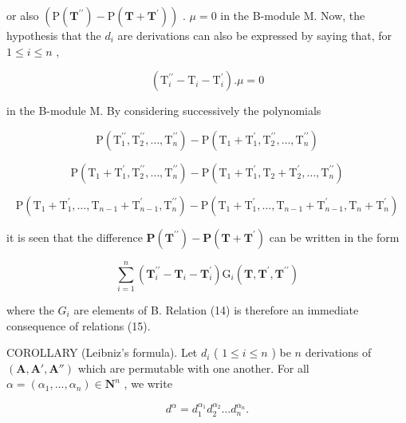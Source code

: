 or also \((\mathrm{P}(\mathbf{T}^{\prime\prime}) - \mathrm{P}(\mathbf{T} + \mathbf{T}^{\prime}))\) . \(\mu = 0\) in the B-module M. Now, the hypothesis that the \(d_{i}\) are derivations can also be expressed by saying that, for \(1 \leqslant i \leqslant n\) ,

\[
\left(\mathrm{T} _ {i} ^ {\prime \prime} - \mathrm{T} _ {i} - \mathrm{T} _ {i} ^ {\prime}\right). \mu = 0\tag{15}
\]

in the B-module M. By considering successively the polynomials

\[
\mathrm{P} \left(\mathrm{T} _ {1} ^ {\prime \prime}, \mathrm{T} _ {2} ^ {\prime \prime}, \dots , \mathrm{T} _ {n} ^ {\prime \prime}\right) - \mathrm{P} \left(\mathrm{T} _ {1} + \mathrm{T} _ {1} ^ {\prime}, \mathrm{T} _ {2} ^ {\prime \prime}, \dots , \mathrm{T} _ {n} ^ {\prime \prime}\right)
\]

\[
\mathrm{P} \left(\mathrm{T} _ {1} + \mathrm{T} _ {1} ^ {\prime}, \mathrm{T} _ {2} ^ {\prime \prime}, \dots , \mathrm{T} _ {n} ^ {\prime \prime}\right) - \mathrm{P} \left(\mathrm{T} _ {1} + \mathrm{T} _ {1} ^ {\prime}, \mathrm{T} _ {2} + \mathrm{T} _ {2} ^ {\prime}, \dots , \mathrm{T} _ {n} ^ {\prime \prime}\right)
\]

\[
\mathrm{P} \left(\mathrm{T} _ {1} + \mathrm{T} _ {1} ^ {\prime}, \dots , \mathrm{T} _ {n - 1} + \mathrm{T} _ {n - 1} ^ {\prime}, \mathrm{T} _ {n} ^ {\prime \prime}\right) - \mathrm{P} \left(\mathrm{T} _ {1} + \mathrm{T} _ {1} ^ {\prime}, \dots , \mathrm{T} _ {n - 1} + \mathrm{T} _ {n - 1} ^ {\prime}, \mathrm{T} _ {n} + \mathrm{T} _ {n} ^ {\prime}\right)
\]

it is seen that the difference \(\mathbf{P}(\mathbf{T}^{\prime \prime}) - \mathbf{P}(\mathbf{T} + \mathbf{T}^{\prime})\) can be written in the form

\[
\sum_ {i = 1} ^ {n} \left(\mathbf {T} _ {i} ^ {\prime \prime} - \mathbf {T} _ {i} - \mathbf {T} _ {i} ^ {\prime}\right) \mathrm{G} _ {i} (\mathbf {T}, \mathbf {T} ^ {\prime}, \mathbf {T} ^ {\prime \prime})
\]

where the \(G_{i}\) are elements of B. Relation (14) is therefore an immediate consequence of relations (15).

COROLLARY (Leibniz's formula). Let \(d_{i}\) ( \(1 \leqslant i \leqslant n\) ) be \(n\) derivations of \((\mathbf{A}, \mathbf{A}', \mathbf{A}'' )\) which are permutable with one another. For all \(\alpha = (\alpha_{1}, \ldots, \alpha_{n}) \in \mathbf{N}^{n}\) , we write

\[
d ^ {\alpha} = d _ {1} ^ {\alpha_ {1}} d _ {2} ^ {\alpha_ {2}} \dots d _ {n} ^ {\alpha_ {n}}.\tag{16}
\]

